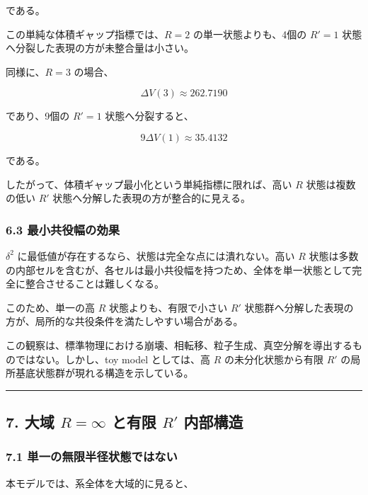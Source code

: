 \documentclass[
]{ltjsarticle}
\begin{document}
である。

この単純な体積ギャップ指標では、\(R=2\) の単一状態よりも、4個の \(R'=1\)
状態へ分裂した表現の方が未整合量は小さい。

同様に、\(R=3\) の場合、

\[
\Delta V(3)\approx262.7190
\]

であり、9個の \(R'=1\) 状態へ分裂すると、

\[
9\Delta V(1)\approx35.4132
\]

である。

したがって、体積ギャップ最小化という単純指標に限れば、高い \(R\)
状態は複数の低い \(R'\) 状態へ分解した表現の方が整合的に見える。

\subsubsection{6.3
最小共役幅の効果}\label{ux6700ux5c0fux5171ux5f79ux5e45ux306eux52b9ux679c}

\(\delta^2\) に最低値が存在するなら、状態は完全な点には潰れない。高い
\(R\)
状態は多数の内部セルを含むが、各セルは最小共役幅を持つため、全体を単一状態として完全に整合させることは難しくなる。

このため、単一の高 \(R\) 状態よりも、有限で小さい \(R'\)
状態群へ分解した表現の方が、局所的な共役条件を満たしやすい場合がある。

この観察は、標準物理における崩壊、相転移、粒子生成、真空分解を導出するものではない。しかし、toy
model としては、高 \(R\) の未分化状態から有限 \(R'\)
の局所基底状態群が現れる構造を示している。

\begin{center}\rule{0.5\linewidth}{0.5pt}\end{center}

\subsection{\texorpdfstring{7. 大域 \(R=\infty\) と有限 \(R'\)
内部構造}{7. 大域 R=\textbackslash infty と有限 R\textquotesingle{} 内部構造}}\label{ux5927ux57df-rinfty-ux3068ux6709ux9650-r-ux5185ux90e8ux69cbux9020}

\subsubsection{7.1
単一の無限半径状態ではない}\label{ux5358ux4e00ux306eux7121ux9650ux534aux5f84ux72b6ux614bux3067ux306fux306aux3044}

本モデルでは、系全体を大域的に見ると、
\end{document}
